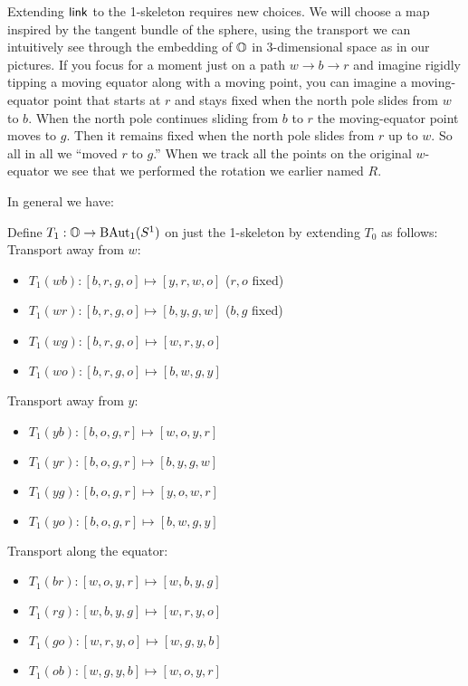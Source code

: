 Extending \( \mathsf{link} \) to the 1-skeleton requires new choices. We will choose a map inspired by the tangent bundle of the sphere, using the transport we can intuitively see through the embedding of \( \mathbb{O} \) in 3-dimensional space as in our pictures. If you focus for a moment just on a path \( w\to b\to r \) and imagine rigidly tipping a moving equator along with a moving point, you can imagine a moving-equator point that starts at \( r \) and stays fixed when the north pole slides from \( w \) to \( b \). When the north pole continues sliding from \( b \) to \( r \) the moving-equator point moves to \( g \). Then it remains fixed when the north pole slides from \( r \) up to \( w \). So all in all we ``moved \( r \) to \( g \).'' When we track all the points on the original \( w \)-equator we see that we performed the rotation we earlier named \( R \).



In general we have:
\begin{mydef}
Define \( T_1:\mathbb{O}\to\mathrm{BAut}_1(S^1) \) on just the 1-skeleton by extending \( T_0 \) as follows:
Transport away from \( w \):
\begin{itemize}
\item \( T_1(wb):[b, r, g, o]\mapsto [y, r, w, o] \) (\( r, o \) fixed)
\item \( T_1(wr):[b, r, g, o]\mapsto [b, y, g, w] \) (\( b, g \) fixed)
\item \( T_1(wg):[b, r, g, o]\mapsto [w, r, y, o] \)
\item \( T_1(wo):[b, r, g, o]\mapsto [b, w, g, y] \)
\end{itemize}
Transport away from \( y \):
\begin{itemize}
\item \( T_1(yb):[b, o, g, r]\mapsto [w, o, y, r] \)
\item \( T_1(yr):[b, o, g, r]\mapsto [b, y, g, w] \)
\item \( T_1(yg):[b, o, g, r]\mapsto [y, o, w, r] \)
\item \( T_1(yo):[b, o, g, r]\mapsto [b, w, g, y] \)
\end{itemize}
Transport along the equator:
\begin{itemize}
\item \( T_1(br):[w, o, y, r]\mapsto [w, b, y, g] \) 
\item \( T_1(rg):[w, b, y, g]\mapsto [w, r, y, o] \)
\item \( T_1(go):[w, r, y, o]\mapsto [w, g, y, b] \)
\item \( T_1(ob):[w, g, y, b]\mapsto [w, o, y, r] \)
\end{itemize}
\end{mydef}

